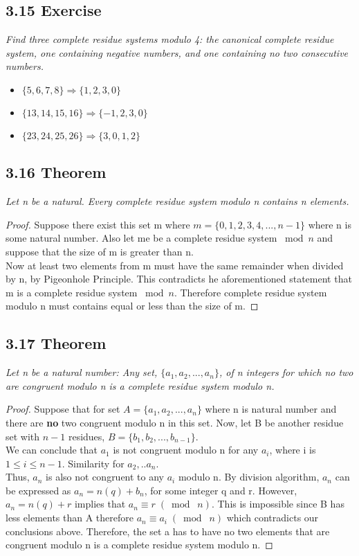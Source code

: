\documentclass{article}
\begin{document}
\subsection*{3.15 Exercise} 
\quad \textit{Find three complete residue systems modulo 4: the canonical complete residue system, one containing negative numbers, and one containing no two consecutive numbers.}

\begin{itemize}
    \item $\{5,6,7,8\} \Longrightarrow \{1,2,3,0\}$
    \item $\{13,14,15,16\} \Longrightarrow \{-1,2,3,0\}$
    \item $\{23,24,25,26\} \Longrightarrow \{3,0,1,2\}$
\end{itemize}

\subsection*{3.16 Theorem} 
\quad \textit{Let n be a natural. Every complete residue system modulo n contains n elements.}

\begin{proof}
Suppose there exist this set m where $m = \{0,1,2,3,4,...,n-1\}$ where n is some natural number. Also let me be a complete residue system $\bmod n$ and suppose that the size of m is greater than n.\\
Now at least two elements from m must have the same remainder when divided by n, by Pigeonhole Principle. This contradicts he aforementioned statement that m is a complete residue system $\bmod n$. Therefore complete residue system modulo n must contains equal or less than the size of m.
\end{proof}

\subsection*{3.17 Theorem} 
\quad \textit{Let n be a natural number: Any set, $\{a_1,a_2,...,a_n\}$, of n integers for which no two are congruent modulo n is a complete residue system modulo n.}

\begin{proof}
Suppose that for set $A = \{a_1,a_2,...,a_n\}$ where n is natural number and there are \textbf{no} two congruent modulo n in this set. Now, let B be another residue set with $n-1$ residues, $B = \{b_1,b_2,...,b_{n-1}\}$. \\
We can conclude that $a_1$ is not congruent modulo n for any $a_i$, where i is $1 \leq i \leq n-1$. Similarity for $a_2,..a_n$.\\
Thus, $a_n$ is also not congruent to any $a_i$ modulo n. By division algorithm, $a_n$ can be expressed as $a_n = n(q) + b_n$, for some integer q and r. However, $a_n = n(q) + r$ implies that $a_n \equiv r \;(\bmod\; n)$. This is impossible since B has less elements than A therefore $a_n \equiv a_i \;(\bmod\; n)$ which contradicts our conclusions above. Therefore, the set a has to have no two elements that are congruent modulo n is a complete residue system modulo n.
\end{proof}
\end{document}
